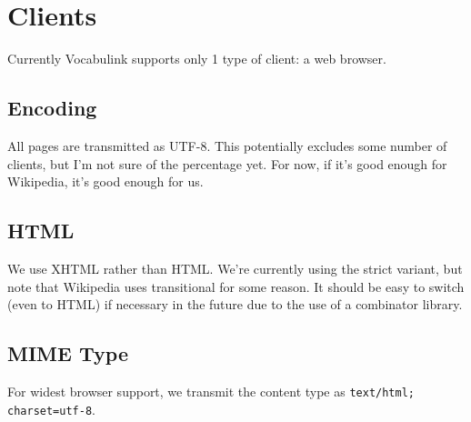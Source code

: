 \chapter{Clients}

Currently Vocabulink supports only 1 type of client: a web browser.

\section{Encoding}

All pages are transmitted as UTF-8. This potentially excludes some number of
clients, but I'm not sure of the percentage yet. For now, if it's good enough
for Wikipedia, it's good enough for us.

\section{HTML}

We use XHTML rather than HTML. We're currently using the strict variant, but
note that Wikipedia uses transitional for some reason. It should be easy to
switch (even to HTML) if necessary in the future due to the use of a combinator
library.

\section{MIME Type}

For widest browser support, we transmit the content type as
\verb!text/html; charset=utf-8!.
